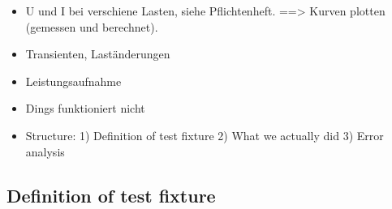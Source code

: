 \begin{itemize}
    \item
        U und I bei verschiene Lasten, siehe Pflichtenheft.
            ==> Kurven plotten (gemessen und berechnet).
    \item
        Transienten, Laständerungen
    \item
        Leistungsaufnahme
    \item
        Dings funktioniert nicht
    \item
        Structure:
            1) Definition of test fixture
            2) What we actually did
            3) Error analysis
\end{itemize}


\subsection{Definition of test fixture}


